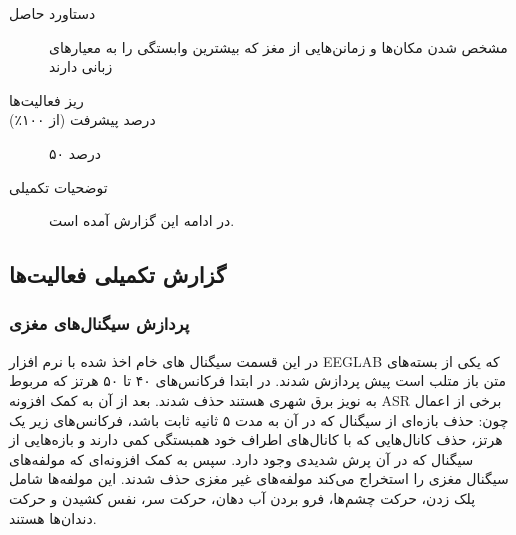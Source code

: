 \begin{enumerate}
{\begin{description}
			\item[دستاورد حاصل] مشخص شدن مکان‌ها و زمانن‌هایی از مغز که بیشترین وابستگی را به معیار‌های زبانی دارند	
			\item[ریز فعالیت‌ها]
			{
			}
			\item[درصد پیشرفت (از ۱۰۰٪)] ۵۰ درصد	
			\item[توضحیات تکمیلی] در ادامه این گزارش آمده است.
		\end{description}
	}

\end{enumerate}
\subsection{گزارش تکمیلی فعالیت‌ها}
\subsubsection{پردازش سیگنال‌های مغزی}
در این قسمت سیگنال های خام اخذ شده 
\cite{latifzadeh2020evaluating}
با نرم افزار EEGLAB
\cite{delorme2004eeglab}
که یکی از بسته‌های متن باز متلب است پیش پردازش شدند. در ابتدا فرکانس‌های ۴۰ تا ۵۰ هرتز که مربوط به نویز برق شهری هستند حذف شدند. بعد از آن به کمک افزونه ASR برخی از اعمال چون: حذف بازه‌ای از سیگنال که در آن به مدت ۵ ثانیه ثابت باشد، فرکانس‌های زیر یک هرتز،‌ حذف کانال‌هایی که با کانال‌های اطراف خود همبستگی کمی دارند و بازه‌هایی از سیگنال که در آن پرش شدیدی وجود دارد.
\newline
 سپس به کمک افزونه‌ای که مولفه‌های سیگنال مغزی را استخراج می‌کند مولفه‌های غیر مغزی حذف شدند. این مولفه‌ها شامل پلک زدن، حرکت چشم‌ها، فرو بردن آب دهان، حرکت سر، نفس کشیدن و حرکت دندان‌ها هستند.
